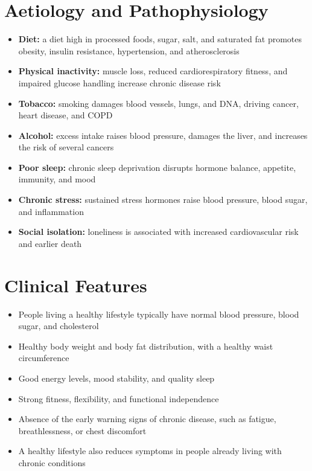 \section*{Aetiology and Pathophysiology}
\begin{itemize}
    \item \textbf{Diet:} a diet high in processed foods, sugar, salt, and saturated fat promotes obesity, insulin resistance, hypertension, and atherosclerosis
    \item \textbf{Physical inactivity:} muscle loss, reduced cardiorespiratory fitness, and impaired glucose handling increase chronic disease risk
    \item \textbf{Tobacco:} smoking damages blood vessels, lungs, and DNA, driving cancer, heart disease, and COPD
    \item \textbf{Alcohol:} excess intake raises blood pressure, damages the liver, and increases the risk of several cancers
    \item \textbf{Poor sleep:} chronic sleep deprivation disrupts hormone balance, appetite, immunity, and mood
    \item \textbf{Chronic stress:} sustained stress hormones raise blood pressure, blood sugar, and inflammation
    \item \textbf{Social isolation:} loneliness is associated with increased cardiovascular risk and earlier death
\end{itemize}

\section*{Clinical Features}
\begin{itemize}
    \item People living a healthy lifestyle typically have normal blood pressure, blood sugar, and cholesterol
    \item Healthy body weight and body fat distribution, with a healthy waist circumference
    \item Good energy levels, mood stability, and quality sleep
    \item Strong fitness, flexibility, and functional independence
    \item Absence of the early warning signs of chronic disease, such as fatigue, breathlessness, or chest discomfort
    \item A healthy lifestyle also reduces symptoms in people already living with chronic conditions
\end{itemize}

